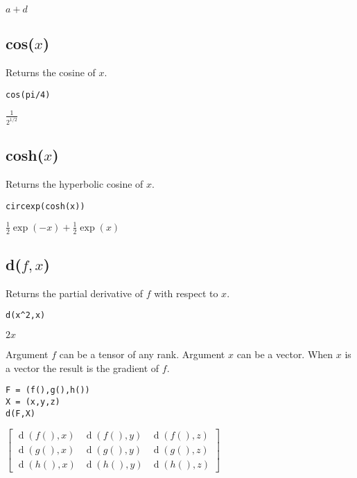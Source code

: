 \noindent
$a + d$

\subsection*{cos($x$)}

Returns the cosine of $x$.

{\color{blue}
\begin{verbatim}
cos(pi/4)
\end{verbatim}
}

\noindent
$\displaystyle \frac{1}{2^{1/2}}$

\subsection*{cosh($x$)}

Returns the hyperbolic cosine of $x$.

{\color{blue}
\begin{verbatim}
circexp(cosh(x))
\end{verbatim}
}

\noindent
$\tfrac{1}{2}\exp(-x)+\tfrac{1}{2}\exp(x)$

\subsection*{d($f,x$)}

Returns the partial derivative of $f$ with respect to $x$.

{\color{blue}
\begin{verbatim}
d(x^2,x)
\end{verbatim}
}

\noindent
$2x$

\bigskip
\noindent
Argument $f$ can be a tensor of any rank.
Argument $x$ can be a vector.
When $x$ is a vector the result is the gradient of $f$.

{\color{blue}
\begin{verbatim}
F = (f(),g(),h())
X = (x,y,z)
d(F,X)
\end{verbatim}
}

\noindent
$\displaystyle
\begin{bmatrix}
\operatorname{d}(f(),x) & \operatorname{d}(f(),y) &  \operatorname{d}(f(),z)
\\[1ex]
\operatorname{d}(g(),x) & \operatorname{d}(g(),y) &  \operatorname{d}(g(),z)
\\[1ex]
\operatorname{d}(h(),x) & \operatorname{d}(h(),y) &  \operatorname{d}(h(),z)
\end{bmatrix}
$

